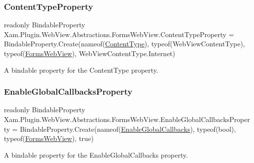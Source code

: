 \subsubsection{\texorpdfstring{Content\+Type\+Property}{ContentTypeProperty}}
{\footnotesize\ttfamily readonly Bindable\+Property Xam.\+Plugin.\+Web\+View.\+Abstractions.\+Forms\+Web\+View.\+Content\+Type\+Property = Bindable\+Property.\+Create(nameof(\hyperlink{class_xam_1_1_plugin_1_1_web_view_1_1_abstractions_1_1_forms_web_view_a7066440f9f0f094ba9266c43e1d940b3}{Content\+Type}), typeof(Web\+View\+Content\+Type), typeof(\hyperlink{class_xam_1_1_plugin_1_1_web_view_1_1_abstractions_1_1_forms_web_view}{Forms\+Web\+View}), Web\+View\+Content\+Type.\+Internet)\hspace{0.3cm}{\ttfamily [static]}}



A bindable property for the Content\+Type property. 

\mbox{\label{class_xam_1_1_plugin_1_1_web_view_1_1_abstractions_1_1_forms_web_view_a6f2e5d107b42e25203b7d6b3af51cf29}} 
\subsubsection{\texorpdfstring{Enable\+Global\+Callbacks\+Property}{EnableGlobalCallbacksProperty}}
{\footnotesize\ttfamily readonly Bindable\+Property Xam.\+Plugin.\+Web\+View.\+Abstractions.\+Forms\+Web\+View.\+Enable\+Global\+Callbacks\+Property = Bindable\+Property.\+Create(nameof(\hyperlink{class_xam_1_1_plugin_1_1_web_view_1_1_abstractions_1_1_forms_web_view_a1aa4c45b99c24d381fbe978a3d85cb25}{Enable\+Global\+Callbacks}), typeof(bool), typeof(\hyperlink{class_xam_1_1_plugin_1_1_web_view_1_1_abstractions_1_1_forms_web_view}{Forms\+Web\+View}), true)\hspace{0.3cm}{\ttfamily [static]}}



A bindable property for the Enable\+Global\+Callbacks property. 

